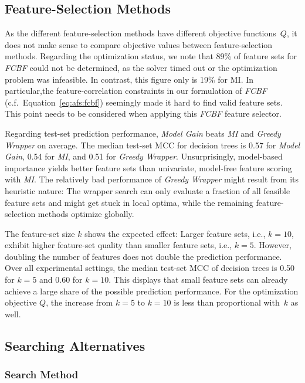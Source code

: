 \documentclass{article}
\theoremstyle{definition}
\begin{document}
\subsection{Feature-Selection Methods}
\label{sec:afs:evaluation:feature-selection}

As the different feature-selection methods have different objective functions~$Q$, it does not make sense to compare objective values between feature-selection methods.
Regarding the optimization status, we note that 89\% of feature sets for \emph{FCBF} could not be determined, as the solver timed out or the optimization problem was infeasible.
In contrast, this figure only is 19\% for MI.
In particular,the feature-correlation constraints in our formulation of \emph{FCBF} (c.f.~Equation~\ref{eq:afs:fcbf}) seemingly made it hard to find valid feature sets.
This point needs to be considered when applying this \emph{FCBF} feature selector.

Regarding test-set prediction performance, \emph{Model Gain} beats \emph{MI} and \emph{Greedy Wrapper} on average.
The median test-set MCC for decision trees is 0.57 for \emph{Model Gain}, 0.54 for \emph{MI}, and 0.51 for \emph{Greedy Wrapper}.
Unsurprisingly, model-based importance yields better feature sets than univariate, model-free feature scoring with \emph{MI}.
The relatively bad performance of \emph{Greedy Wrapper} might result from its heuristic nature:
The wrapper search can only evaluate a fraction of all feasible feature sets and might get stuck in local optima, while the remaining feature-selection methods optimize globally.

The feature-set size $k$ shows the expected effect:
Larger feature sets, i.e., $k=10$, exhibit higher feature-set quality than smaller feature sets, i.e., $k=5$.
However, doubling the number of features does not double the prediction performance.
Over all experimental settings, the median test-set MCC of decision trees is 0.50 for $k=5$ and 0.60 for $k=10$.
This displays that small feature sets can already achieve a large share of the possible prediction performance.
For the optimization objective $Q$, the increase from $k=5$ to $k=10$ is less than proportional with~$k$ as well.

\subsection{Searching Alternatives}
\label{sec:afs:evaluation:search}

\subsubsection{Search Method}
\label{sec:afs:evaluation:search:method}
\end{document}
